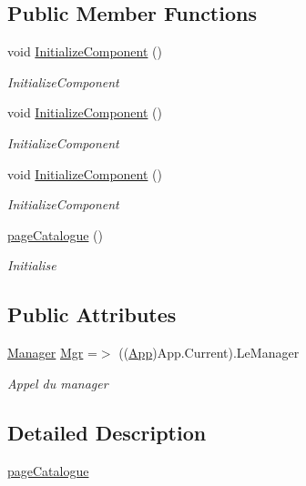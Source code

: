 \subsection*{Public Member Functions}
\begin{DoxyCompactItemize}
\item 
void \hyperlink{classnewPizza1_1_1pageCatalogue_a43a8ad0ab6df5f89084c072525b49383}{Initialize\+Component} ()
\begin{DoxyCompactList}\small\item\em Initialize\+Component \end{DoxyCompactList}\item 
void \hyperlink{classnewPizza1_1_1pageCatalogue_a43a8ad0ab6df5f89084c072525b49383}{Initialize\+Component} ()
\begin{DoxyCompactList}\small\item\em Initialize\+Component \end{DoxyCompactList}\item 
void \hyperlink{classnewPizza1_1_1pageCatalogue_a43a8ad0ab6df5f89084c072525b49383}{Initialize\+Component} ()
\begin{DoxyCompactList}\small\item\em Initialize\+Component \end{DoxyCompactList}\item 
\hyperlink{classnewPizza1_1_1pageCatalogue_a8fca5ae0a3d451a6c8759d1384751a6f}{page\+Catalogue} ()
\begin{DoxyCompactList}\small\item\em Initialise \end{DoxyCompactList}\end{DoxyCompactItemize}
\subsection*{Public Attributes}
\begin{DoxyCompactItemize}
\item 
\hyperlink{classModele_1_1Manager}{Manager} \hyperlink{classnewPizza1_1_1pageCatalogue_a95c606a1eec692ffe15917488596366c}{Mgr} =$>$ ((\hyperlink{classnewPizza1_1_1App}{App})App.\+Current).Le\+Manager
\begin{DoxyCompactList}\small\item\em Appel du manager \end{DoxyCompactList}\end{DoxyCompactItemize}


\subsection{Detailed Description}
\hyperlink{classnewPizza1_1_1pageCatalogue}{page\+Catalogue} 

